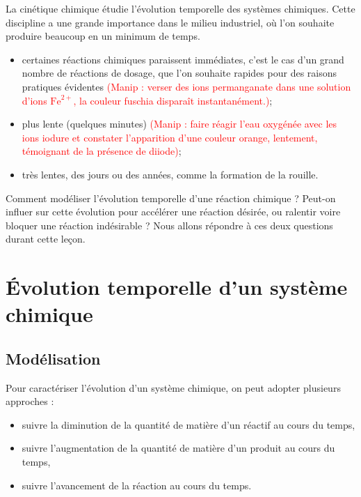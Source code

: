 \documentclass[11pt,a4paper]{report}
\begin{document}
La cinétique chimique étudie l'évolution temporelle des systèmes chimiques. Cette discipline a une grande importance dans le milieu industriel, où l'on souhaite produire beaucoup en un minimum de temps.

\begin{itemize}
	\item certaines réactions chimiques paraissent immédiates, c'est le cas d'un grand nombre de réactions de dosage, que l'on souhaite rapides pour des raisons pratiques évidentes \textcolor{red}{(Manip : verser des ions permanganate dans une solution d'ions $\text{Fe}^{2+}$, la couleur fuschia disparaît instantanément.)};\\
	
	\item plus lente (quelques minutes) \textcolor{red}{(Manip : faire réagir l'eau oxygénée avec 	les ions iodure et constater l'apparition d'une couleur orange, lentement, témoignant de la présence de diiode)};\\
	
	\item très lentes, des jours ou des années, comme la formation de la rouille.\\
\end{itemize}

Comment modéliser l'évolution temporelle d'une réaction chimique ? Peut-on influer sur cette évolution pour accélérer une réaction désirée, ou ralentir voire bloquer une réaction indésirable ? Nous allons répondre à ces deux questions durant cette leçon.

\section{Évolution temporelle d'un système chimique}

\subsection{Modélisation}

Pour caractériser l'évolution d'un système chimique, on peut adopter plusieurs approches :
\begin{itemize}
	\item suivre la diminution de la quantité de matière d'un réactif au cours du temps, 
	\item suivre l'augmentation de la quantité de matière d'un produit au cours du temps,
	\item suivre l'avancement de la réaction au cours du temps.\\
\end{itemize}
\end{document}
